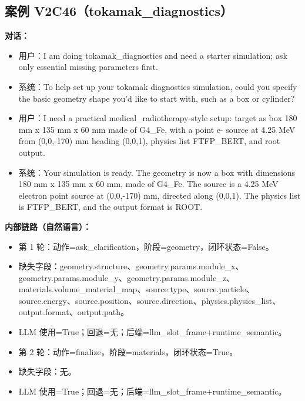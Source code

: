 \documentclass[11pt]{ctexart}
\begin{document}
\subsection{案例 V2C46（tokamak\_diagnostics）}
\textbf{对话：}
\begin{itemize}
\item 用户：I am doing tokamak\_diagnostics and need a starter simulation; ask only essential missing parameters first.
\item 系统：To help set up your tokamak diagnostics simulation, could you specify the basic geometry shape you'd like to start with, such as a box or cylinder?
\item 用户：I need a practical medical\_radiotherapy-style setup: target as box 180 mm x 135 mm x 60 mm made of G4\_Fe, with a point e- source at 4.25 MeV from (0,0,-170) mm heading (0,0,1), physics list FTFP\_BERT, and root output.
\item 系统：Your simulation is ready. The geometry is now a box with dimensions 180 mm x 135 mm x 60 mm, made of G4\_Fe. The source is a 4.25 MeV electron point source at (0,0,-170) mm, directed along (0,0,1). The physics list is FTFP\_BERT, and the output format is ROOT.
\end{itemize}
\textbf{内部链路（自然语言）：}
\begin{itemize}
\item 第 1 轮：动作=ask\_clarification，阶段=geometry，闭环状态=False。
\item 缺失字段：geometry.structure、geometry.params.module\_x、geometry.params.module\_y、geometry.params.module\_z、materials.volume\_material\_map、source.type、source.particle、source.energy、source.position、source.direction、physics.physics\_list、output.format、output.path。
\item LLM 使用=True；回退=无；后端=llm\_slot\_frame+runtime\_semantic。
\item 第 2 轮：动作=finalize，阶段=materials，闭环状态=True。
\item 缺失字段：无。
\item LLM 使用=True；回退=无；后端=llm\_slot\_frame+runtime\_semantic。
\end{itemize}
\end{document}

